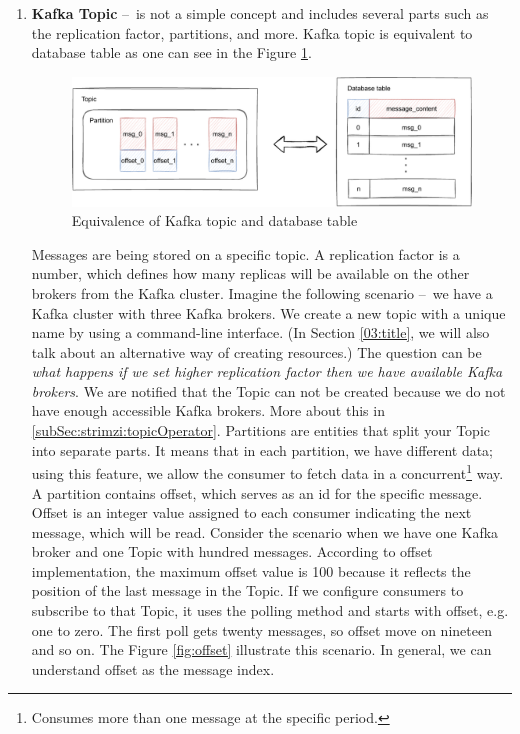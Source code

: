 \begin{enumerate}
    \item \textbf{Kafka Topic} \---\ is not a simple concept and includes several parts such as the replication factor, partitions, and more. Kafka topic is equivalent to database table as one can see in the Figure \ref{fig:topicAndDatabaseTable}.
     \begin{figure}[!ht]
    \centering
    \includegraphics[scale=0.80]{obrazky-figures/02-preliminaries/02-kafka/03-database-relation.pdf}
    \caption{Equivalence of Kafka topic and database table}
    \label{fig:topicAndDatabaseTable}
    \end{figure}
    

    Messages are being stored on a specific topic. A replication factor is a number, which defines how many replicas will be available on the other brokers from the Kafka cluster. Imagine the following scenario \---\ we have a Kafka cluster with three Kafka brokers. We create a new topic with a unique name by using a command-line interface. (In Section \ref{03:title}, we will also talk about an alternative way of creating resources.) The question can be \emph{what happens if we set higher replication factor then we have available Kafka brokers}. We are notified that the Topic can not be created because we do not have enough accessible Kafka brokers. More about this in \ref{subSec:strimzi:topicOperator}. Partitions are entities that split your Topic into separate parts. It means that in each partition, we have different data; using this feature, we allow the consumer to fetch data in a concurrent\footnote{Consumes more than one message at the specific period.} way. A partition contains offset, which serves as an id for the specific message. Offset is an integer value assigned to each consumer indicating the next message, which will be read. Consider the scenario when we have one Kafka broker and one Topic with hundred messages. According to offset implementation, the maximum offset value is 100 because it reflects the position of the last message in the Topic. If we configure consumers to subscribe to that Topic, it uses the polling method and starts with offset, e.g. one to zero. The first poll gets twenty messages, so offset move on nineteen and so on. The Figure  \ref{fig:offset} illustrate this scenario. In general, we can understand offset as the message index.
    

\end{enumerate}

